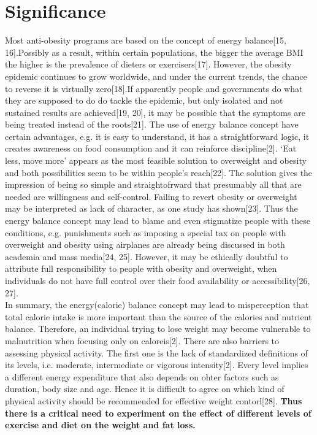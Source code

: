 \documentclass[11pt]{article}  %
\begin{document}
\section{Significance}
Most anti-obesity programs are based on the concept of energy balance[15, 16].Possibly as a result, within certain populations, the bigger the average BMI the higher is the prevalence of dieters or exercisers[17]. However, the obesity epidemic continues to grow worldwide, and under the current trends, the chance to reverse it is virtually zero[18].If apparently people and governments do what they are supposed to do do tackle the epidemic, but only isolated and not sustained results are achieved[19, 20], it may be possible that the symptoms are being treated instead of the roots[21]. The use of energy balance concept have certain advantages, e.g. it is easy to understand, it has a straightforward logic, it creates awareness on food consumption and it can reinforce discipline[2]. `Eat less, move more' appears as the most feasible solution to overweight and obesity and both possibilities seem to be within people's reach[22]. The solution gives the impression of being so simple and straightofrward that presumably all that are needed are willingness and self-control. Failing to revert obesity or overweight may be interpreted as lack of character, as one study has shown[23]. Thus the energy balance concept may lead to blame and even stigmatize people with these conditions, e.g. punishments such as imposing a special tax on people with overweight and obesity using airplanes are already being discussed in both academia and mass media[24, 25]. However, it may be ethically doubtful to attribute full responsibility to people with obesity and overweight, when individuals do not have full control over their food availability or accessibility[26, 27].\\
In summary, the energy(calorie) balance concept may lead to misperception that total calorie intake is more important than the source of the calories and nutrient balance. Therefore, an individual trying to lose weight may become vulnerable to malnutrition when focusing only on caloreis[2]. There are also barriers to assessing physical activity. The first one is the lack of standardized definitions of its levels, i.e. moderate, intermediate or vigorous intensity[2]. Every level implies a different energy expenditure that also depends on ohter factors such as duration, body size and age. Hence it is difficult to agree on which kind of physical activity should be recommended for effective weight contorl[28]. \textbf{Thus there is a critical need to experiment on the effect of different levels of exercise and diet on the weight and fat loss.}
\end{document}

